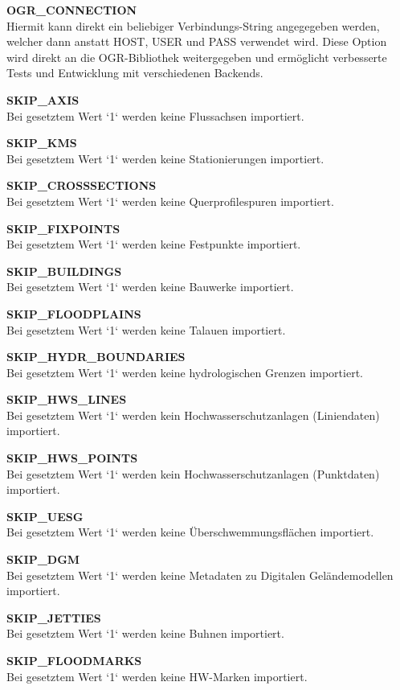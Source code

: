\textbf{OGR\_CONNECTION}
\\Hiermit kann direkt ein beliebiger Verbindungs-String angegegeben
werden, welcher dann anstatt HOST, USER und PASS verwendet wird.
Diese Option wird direkt an die OGR-Bibliothek weitergegeben und ermöglicht
verbesserte Tests und Entwicklung mit verschiedenen Backends.

\textbf{SKIP\_AXIS}
\\Bei gesetztem Wert `1` werden keine Flussachsen importiert.

\textbf{SKIP\_KMS}
\\Bei gesetztem Wert `1` werden keine Stationierungen importiert.

\textbf{SKIP\_CROSSSECTIONS}
\\Bei gesetztem Wert `1` werden keine Querprofilespuren importiert.

\textbf{SKIP\_FIXPOINTS}
\\Bei gesetztem Wert `1` werden keine Festpunkte importiert.

\textbf{SKIP\_BUILDINGS}
\\Bei gesetztem Wert `1` werden keine Bauwerke importiert.

\textbf{SKIP\_FLOODPLAINS}
\\Bei gesetztem Wert `1` werden keine Talauen importiert.

\textbf{SKIP\_HYDR\_BOUNDARIES}
\\Bei gesetztem Wert `1` werden keine hydrologischen Grenzen importiert.

\textbf{SKIP\_HWS\_LINES}
\\Bei gesetztem Wert `1` werden kein Hochwasserschutzanlagen  (Liniendaten) importiert.

\textbf{SKIP\_HWS\_POINTS}
\\Bei gesetztem Wert `1` werden kein Hochwasserschutzanlagen (Punktdaten) importiert.

\textbf{SKIP\_UESG}
\\Bei gesetztem Wert `1` werden keine Überschwemmungsflächen importiert.

\textbf{SKIP\_DGM}
\\Bei gesetztem Wert `1` werden keine Metadaten zu Digitalen Geländemodellen importiert.

\textbf{SKIP\_JETTIES}
\\Bei gesetztem Wert `1` werden keine Buhnen importiert.

\textbf{SKIP\_FLOODMARKS}
\\Bei gesetztem Wert `1` werden keine HW-Marken importiert.

